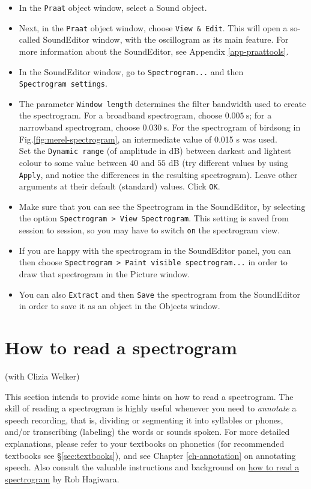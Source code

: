 \documentclass[
]{book}
\begin{document}
\begin{itemize}
\item
  In the \texttt{Praat} object window, select a Sound object.
\item
  Next, in the \texttt{Praat} object window, choose \texttt{View\ \&\ Edit}. This will open a so-called SoundEditor window, with the oscillogram as its main feature. For more information about the SoundEditor, see Appendix \ref{app-praattools}.
\item
  In the SoundEditor window, go to \texttt{Spectrogram...} and then \texttt{Spectrogram\ settings}.
\item
  The parameter \texttt{Window\ length} determines the filter bandwidth used to create the spectrogram. For a broadband spectrogram, choose \(0.005\ \textrm{s}\); for a narrowband spectrogram, choose \(0.030\ \textrm{s}\).
  For the spectrogram of birdsong in Fig.\ref{fig:merel-spectrogram}, an intermediate value of 0.015 s was used.\\
  Set the \texttt{Dynamic\ range} (of amplitude in dB) between darkest and lightest colour to some value between \(40\) and \(55\) dB (try different values by using \texttt{Apply}, and notice the differences in the resulting spectrogram).
  Leave other arguments at their default (standard) values. Click \texttt{OK}.
\item
  Make sure that you can see the Spectrogram in the SoundEditor, by selecting the option \texttt{Spectrogram\ \textgreater{}\ View\ Spectrogram}. This setting is saved from session to session, so you may have to switch \texttt{on} the spectrogram view.
\item
  If you are happy with the spectrogram in the SoundEditor panel, you can then choose \texttt{Spectrogram\ \textgreater{}\ Paint\ visible\ spectrogram...} in order to draw that spectrogram in the Picture window.
\item
  You can also \texttt{Extract} and then \texttt{Save} the spectrogram from the SoundEditor in order to save it as an object in the Objects window.
\end{itemize}

\section{How to read a spectrogram}\label{sec:readspectrogram}

(with Clizia Welker)

\label{box-spectrogram}
This section intends to provide some hints on how to read a spectrogram. The skill of reading a spectrogram is highly useful whenever you need to \emph{annotate} a speech recording, that is, dividing or segmenting it into syllables or phones, and/or transcribing (labeling) the words or sounds spoken. For more detailed explanations, please refer to your textbooks on phonetics (for recommended textbooks see §\ref{sec:textbooks}), and see Chapter \ref{ch-annotation} on annotating speech. Also consult the valuable instructions and background on \href{https://home.cc.umanitoba.ca/~robh/howto.html}{how to read a spectrogram} by Rob Hagiwara.
\end{document}
